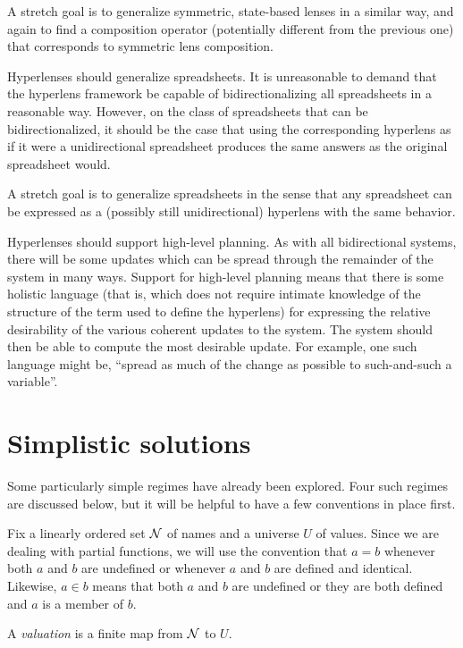 A stretch goal is to generalize symmetric, state-based lenses in a similar
way, and again to find a composition operator (potentially different from
the previous one) that corresponds to symmetric lens composition.

Hyperlenses should generalize spreadsheets. It is unreasonable to demand
that the hyperlens framework be capable of bidirectionalizing all
spreadsheets in a reasonable way. However, on the class of spreadsheets that
can be bidirectionalized, it should be the case that using the corresponding
hyperlens as if it were a unidirectional spreadsheet produces the same
answers as the original spreadsheet would.

A stretch goal is to generalize spreadsheets in the sense that any
spreadsheet can be expressed as a (possibly still unidirectional) hyperlens
with the same behavior.

Hyperlenses should support high-level planning. As with all bidirectional
systems, there will be some updates which can be spread through the
remainder of the system in many ways. Support for high-level planning means
that there is some holistic language (that is, which does not require
intimate knowledge of the structure of the term used to define the
hyperlens) for expressing the relative desirability of the various coherent
updates to the system. The system should then be able to compute the most
desirable update. For example, one such language might be, ``spread as much
of the change as possible to such-and-such a variable''.

\section{Simplistic solutions}
Some particularly simple regimes have already been explored. Four such
regimes are discussed below, but it will be helpful to have a few
conventions in place first.

Fix a linearly ordered set $\mathcal N$ of names and a universe $U$ of values.
Since we are dealing with partial functions, we will use the convention that
$a = b$ whenever both $a$ and $b$ are undefined or whenever $a$ and $b$ are
defined and identical. Likewise, $a \in b$ means that both $a$ and $b$ are
undefined or they are both defined and $a$ is a member of $b$.

\begin{definition}
    A \emph{valuation} is a finite map from $\mathcal N$ to $U$.
\end{definition}

